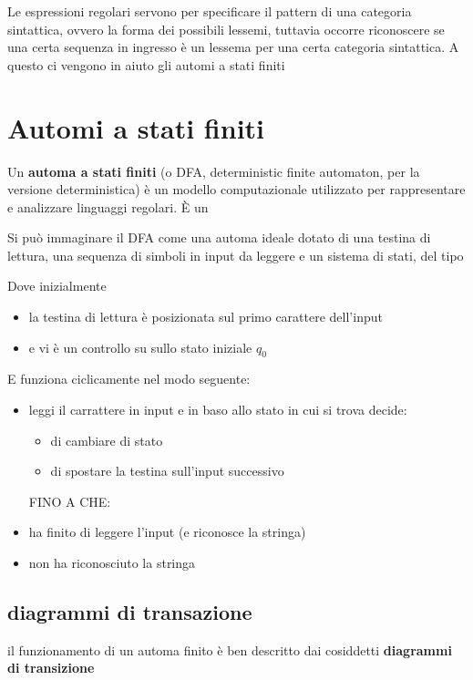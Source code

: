 Le espressioni regolari servono per specificare il pattern di una categoria sintattica, ovvero la forma dei possibili lessemi, tuttavia occorre riconoscere se una certa sequenza in ingresso è un lessema per una certa categoria sintattica. A questo ci vengono in aiuto gli automi a stati finiti

\section{Automi a stati finiti}
Un \textbf{automa a stati finiti} (o DFA, deterministic finite automaton, per la versione deterministica) è un modello computazionale utilizzato per rappresentare e analizzare linguaggi regolari. È un 

Si può immaginare il DFA come una automa ideale dotato di una testina di lettura, una sequenza di simboli in input da leggere e un sistema di stati, del tipo


Dove inizialmente 
\begin{itemize}
    \item la testina di lettura è posizionata sul primo carattere dell'input
    \item e vi è un controllo su sullo stato iniziale $q_0$
\end{itemize}

E funziona ciclicamente nel modo seguente:
\begin{itemize}
    \item leggi il carrattere in input e in baso allo stato in cui si trova decide:
    \begin{itemize}
        \item di cambiare di stato
        \item di spostare la testina sull'input successivo
    \end{itemize}
    FINO A CHE:
    \item ha finito di leggere l'input (e riconosce la stringa)
    \item non ha riconosciuto la stringa 
\end{itemize}

\subsection{diagrammi di transazione}
il funzionamento di un automa finito  è ben descritto dai cosiddetti \textbf{diagrammi di transizione}

